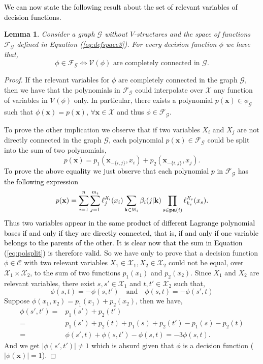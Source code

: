 \documentclass[11pt,a4paper, twoside]{book}
\newtheorem{lemma}{Lemma}[chapter]
\newcommand{\bx}{\mathbf{x}}
\newcommand{\bchi}{\boldsymbol{\mathcal{X}}}
\newcommand{\nchi}{\mathcal{X}}
\begin{document}
\textcolor{black}{We can now state the following result about the set of relevant variables of  decision functions.}
\begin{lemma}
\label{lem:relevant}
Consider a graph $\mathcal{G}$ without $V$-structures and the space of functions $\mathcal{F}_{\mathcal{G}}$ defined in Equation (\ref{eq:defspace3}). For every decision function $\phi$ we have that,
$$ \phi \in \mathcal{F}_{\mathcal{G}} \Leftrightarrow \mathcal{V}(\phi) \text{ are completely connected in } \mathcal{G}.$$
\end{lemma}
\begin{proof}
If the relevant variables for $\phi$ are completely connected in the graph $\mathcal{G}$, then we have that the polynomials in $\mathcal{F}_{\mathcal{G}}$ could interpolate over $\bchi$ any function of variables in $\mathcal{V}(\phi)$ only. In particular, there exists a polynomial $p(\mathbf{x})\in\mathcal{\phi}_{\mathcal{G}}$ such that $\phi(\mathbf{x})=p(\mathbf{x})$, $\forall \mathbf{x}\in{\bchi}$ and thus $\phi \in \mathcal{F}_{\mathcal{G}}$.

To prove the other implication we observe that if two variables $X_i$ and $X_j$ are not directly connected in the graph $\mathcal{G}$, each polynomial $p(\mathbf{x})\in \mathcal{F}_{\mathcal{G}}$ could be split into the sum of two polynomials,
\begin{equation} p(\mathbf{x})=p_1(\mathbf{x}_{-\{i,j\}},x_i)+p_2(\mathbf{x}_{-\{i,j\}},x_j).
\label{eq:polsplit}
 \end{equation} 
\textcolor{black}{To prove the above equality we just observe that each polynomial $p$ in $\mathcal{F}_{\mathcal{G}}$ has the following expression
$$ p(\mathbf{x})=\sum_{i=1}^{n}\sum_{j=1}^{m_i} \ell_{j}^{\nchi_i}(x_i)\sum_{\mathbf{k} \in \mathbb{M}_i}\beta_i(j|\mathbf{k})\prod_{s\in{\bf pa}(i)}\ell_{k_s}^{\nchi_s}(x_s).$$
Thus two variables appear in the same product of different Lagrange polynomial bases if and only if they are directly connected, that is, if and only if one variable belongs to the parents of the other.
It is clear now that the sum in Equation (\ref{eq:polsplit}) is therefore valid.  
 }
So we have only to prove that a decision function $\phi \in \mathcal{C}$ with two relevant variables $X_1\in\nchi_1,X_2\in\nchi_2$ could not be equal, over $\nchi_1\times\nchi_2$, to the sum of two functions $p_1(x_1)$ and $p_2(x_2)$.
Since $X_1$ and $X_2$ are relevant variables, there exist $s,s'\in\nchi_1$ and $t,t'\in\nchi_2$ such that,
$$ \phi(s,t)=- \phi(s,t') \quad \text{and} \quad \phi(s,t)=-\phi(s',t) $$
Suppose $\phi(x_1,x_2)=p_1(x_1)+p_2(x_2)$, then we have,
\begin{align*} \phi(s',t')=& p_1(s')+p_2(t') \\
=&p_1(s')+p_2(t)+p_1(s)+p_2(t')-p_1(s)-p_2(t) \\
=&\phi(s',t)+\phi(s,t')-\phi(s,t)=-3\phi(s,t).  
\end{align*}
And we get $|\phi(s',t')|\neq 1$ which is absurd given that $\phi$ is a decision function ($|\phi(\bx)| = 1$).
\end{proof}
\end{document}
